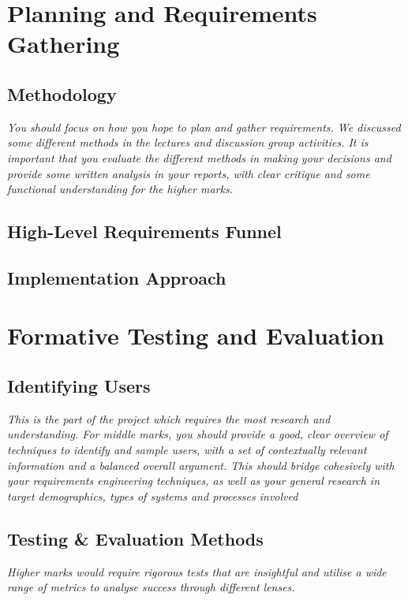 \documentclass{article}
\begin{document}
\section{Planning and Requirements Gathering}
\subsection{Methodology}
\textit{You should focus on how you hope to plan and gather requirements. We discussed some different methods in the lectures and discussion group activities. It is important that you evaluate the different methods in making your decisions and provide some written analysis in your reports, with clear critique and some functional understanding for the higher marks.}
\subsection{High-Level Requirements Funnel}

\subsection{Implementation Approach}

\section{Formative Testing and Evaluation}
\subsection{Identifying Users}
\textit{This is the part of the project which requires the most research and understanding. For middle marks, you should provide a good, clear overview of techniques to identify and sample users, with a set of contextually relevant information and a balanced overall argument. This should bridge cohesively with your requirements engineering techniques, as well as your general research in target demographics, types of systems and processes involved}
\subsection{Testing \& Evaluation Methods}
\textit{Higher marks would require rigorous tests that are insightful and utilise a wide range of metrics to analyse success through different lenses.}


\subsection{}
\end{document}

